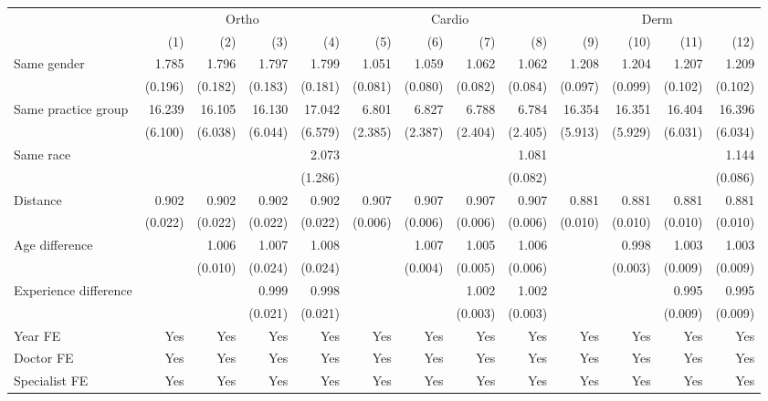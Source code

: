 \begin{tabular}{lrrrrrrrrrrrr}
\toprule
\multicolumn{1}{c}{ } & \multicolumn{4}{c}{Ortho} & \multicolumn{4}{c}{Cardio} & \multicolumn{4}{c}{Derm} \\
\cmidrule(l{3pt}r{3pt}){2-5} \cmidrule(l{3pt}r{3pt}){6-9} \cmidrule(l{3pt}r{3pt}){10-13}
 & (1) & (2) & (3) & (4) & (5) & (6) & (7) & (8) & (9) & (10) & (11) & (12)\\
\midrule
Same gender & 1.785 & 1.796 & 1.797 & 1.799 & 1.051 & 1.059 & 1.062 & 1.062 & 1.208 & 1.204 & 1.207 & 1.209\\
 & (0.196) & (0.182) & (0.183) & (0.181) & (0.081) & (0.080) & (0.082) & (0.084) & (0.097) & (0.099) & (0.102) & (0.102)\\
Same practice group & 16.239 & 16.105 & 16.130 & 17.042 & 6.801 & 6.827 & 6.788 & 6.784 & 16.354 & 16.351 & 16.404 & 16.396\\
 & (6.100) & (6.038) & (6.044) & (6.579) & (2.385) & (2.387) & (2.404) & (2.405) & (5.913) & (5.929) & (6.031) & (6.034)\\
Same race &   &   &   & 2.073 &   &   &   & 1.081 &   &   &   & 1.144\\
 &   &   &   & (1.286) &   &   &   & (0.082) &   &   &   & (0.086)\\
Distance & 0.902 & 0.902 & 0.902 & 0.902 & 0.907 & 0.907 & 0.907 & 0.907 & 0.881 & 0.881 & 0.881 & 0.881\\
 & (0.022) & (0.022) & (0.022) & (0.022) & (0.006) & (0.006) & (0.006) & (0.006) & (0.010) & (0.010) & (0.010) & (0.010)\\
Age difference &   & 1.006 & 1.007 & 1.008 &   & 1.007 & 1.005 & 1.006 &   & 0.998 & 1.003 & 1.003\\
 &   & (0.010) & (0.024) & (0.024) &   & (0.004) & (0.005) & (0.006) &   & (0.003) & (0.009) & (0.009)\\
Experience difference &   &   & 0.999 & 0.998 &   &   & 1.002 & 1.002 &   &   & 0.995 & 0.995\\
 &   &   & (0.021) & (0.021) &   &   & (0.003) & (0.003) &   &   & (0.009) & (0.009)\\
\midrule
Year FE & Yes & Yes & Yes & Yes & Yes & Yes & Yes & Yes & Yes & Yes & Yes & Yes\\
Doctor FE & Yes & Yes & Yes & Yes & Yes & Yes & Yes & Yes & Yes & Yes & Yes & Yes\\
Specialist FE & Yes & Yes & Yes & Yes & Yes & Yes & Yes & Yes & Yes & Yes & Yes & Yes\\
\bottomrule
\end{tabular}
